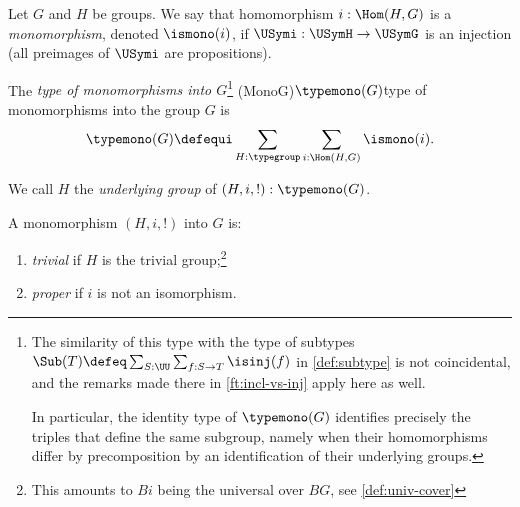 \begin{definition}
  \label{def:typeofmono}
  Let $G$ and $H$ be groups. We say that homomorphism $i: \Hom(H,G)$ is
  a \emph{monomorphism}, denoted $\ismono(i)$,
  if $\USymi:\USymH\to \USymG$ is an injection  
  (all preimages of $\USymi$ are propositions).
  
  The \emph{type of monomorphisms into $G$}\footnote{%
  The similarity of this type with the type of subtypes
  $\Sub(T) \defeq \sum_{S:\UU}\sum_{f:S\to T}\isinj(f)$ in
  \cref{def:subtype} is not coincidental, and the remarks made 
  there in \cref{ft:incl-vs-inj} apply here as well.
  
  In particular, the identity type of $\typemono(G)$
  identifies precisely the triples that define the same subgroup,
  namely when their homomorphisms differ by precomposition by an 
  identification of their underlying groups.
  
  }
  \glossary(MonoG){$\protect{\typemono(G)}$}{type of monomorphisms%
  into the group $G$} 
  is
  \[
  \typemono(G)\defequi\sum_{H:\typegroup}\sum_{i:\Hom(H,G)}\ismono(i).
  \]
  
  We call $H$ the \emph{underlying group} of $(H,i,!) : \typemono(G)$.
  
  A monomorphism $(H,i,!)$ into $G$ is:
      \begin{enumerate}
      \item \emph{trivial} 
      if $H$ is the trivial group;\footnote{This amounts to $Bi$
      being the universal \covering over $BG$, see \cref{def:univ-cover}}
      \item \emph{proper} if $i$ is 
      not an isomorphism.\qedhere
      \end{enumerate}
\end{definition}
    
